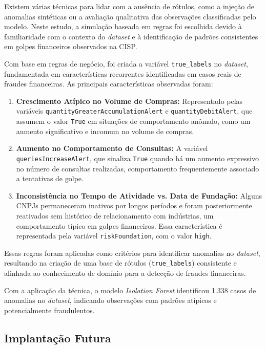 \documentclass[12pt,a4paper]{article}
\begin{document}
Existem várias técnicas para lidar com a ausência de rótulos, como a injeção de anomalias sintéticas ou a avaliação qualitativa das observações classificadas pelo modelo. Neste estudo, a simulação baseada em regras foi escolhida devido à familiaridade com o contexto do \textit{dataset} e à identificação de padrões consistentes em golpes financeiros observados na CISP.

Com base em regras de negócio, foi criada a variável \texttt{true\_labels} no \textit{dataset}, fundamentada em características recorrentes identificadas em casos reais de fraudes financeiras. As principais características observadas foram:

\begin{enumerate}
    \item \textbf{Crescimento Atípico no Volume de Compras:} Representado pelas variáveis \texttt{quantityGreaterAccumulationAlert} e \texttt{quantityDebitAlert}, que assumem o valor \texttt{True} em situações de comportamento anômalo, como um aumento significativo e incomum no volume de compras.

    \item \textbf{Aumento no Comportamento de Consultas:} A variável \texttt{queriesIncreaseAlert}, que sinaliza \texttt{True} quando há um aumento expressivo no número de consultas realizadas, comportamento frequentemente associado a tentativas de golpe.

    \item \textbf{Inconsistência no Tempo de Atividade vs. Data de Fundação:} Alguns CNPJs permaneceram inativos por longos períodos e foram posteriormente reativados sem histórico de relacionamento com indústrias, um comportamento típico em golpes financeiros. Essa característica é representada pela variável \texttt{riskFoundation}, com o valor \texttt{high}.
\end{enumerate}

Essas regras foram aplicadas como critérios para identificar anomalias no \textit{dataset}, resultando na criação de uma base de rótulos (\texttt{true\_labels}) consistente e alinhada ao conhecimento de domínio para a detecção de fraudes financeiras.

Com a aplicação da técnica, o modelo \textit{Isolation Forest} identificou 1.338 casos de anomalias no \textit{dataset}, indicando observações com padrões atípicos e potencialmente fraudulentos.

\subsection{Implantação Futura}
\end{document}
